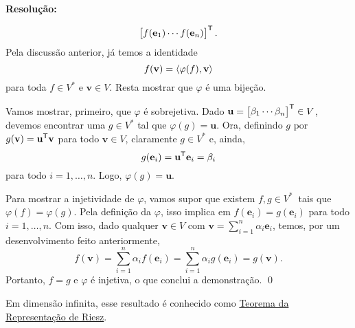 \documentclass[leqno]{article}
\numberwithin{equation}{section}
\newcommand{\bfv}{\mathbf{v}}
\newcommand{\bfu}{\mathbf{u}}
\newcommand{\bfe}{\mathbf{e}}
\newenvironment{sol}
{
    \vspace{4mm}
    \noindent\textbf{Resolução:}
    \strut\newline
    \smallskip
    \hspace{-3.5mm}
}
{}
\begin{document}
\begin{enumerate}
\begin{enumerate}
\begin{sol}
\begin{align*}
\begin{bmatrix}
                            f ( \bfe_{ 1 } ) \cdots f ( \bfe_{ n } )
                        \end{bmatrix}^{ \transpose }
                    .\end{align*}
                    Pela discussão anterior, já temos a identidade
                    \begin{equation*}
                        f ( \bfv ) = \dotprod{\varphi ( f ), \bfv}
                    \end{equation*}
                    para toda \( f \in V^{ * } \) e \( \bfv \in V \).
                    Resta mostrar que \( \varphi \) é uma bijeção.

                    Vamos mostrar, primeiro, que \( \varphi \) é sobrejetiva.
                    Dado \( \bfu =
                    \begin{bmatrix}
                        \beta_{ 1 } \cdots \beta_{ n }
                    \end{bmatrix}^{ \transpose } \in V\), devemos encontrar uma \( g \in V^{ * } \) tal que \( \varphi ( g ) = \bfu \).
                    Ora, definindo \( g \) por \( g ( \bfv ) = \bfu^{ \transpose } \bfv \) para todo \( \bfv \in V \), claramente \( g \in V^{ * } \) e, ainda,
                    \begin{equation*}
                        g ( \bfe_{ i } ) = \bfu^{ \transpose } \bfe_{ i } = \beta_{ i }
                    \end{equation*}
                    para todo \( i = 1, \dots, n \).
                    Logo, \( \varphi ( g ) = \bfu \).

                    Para mostrar a injetividade de \( \varphi \), vamos supor que existem \( f, g \in V^{ * } \ \) tais que \( \varphi ( f ) = \varphi ( g ) \).
                    Pela definição da \( \varphi \), isso implica em \( f ( \bfe_{ i } ) = g ( \bfe_{ i } ) \) para todo \( i = 1, \dots, n \).
                    Com isso, dado qualquer \( \bfv \in V \) com \( \bfv = \sum_{ i=1 }^{ n } \alpha_{ i } \bfe_{ i } \), temos, por um desenvolvimento feito anteriormente,
                    \begin{equation*}
                        f ( \bfv )
                        = \sum_{ i=1 }^{ n } \alpha_{ i } f ( \bfe_{ i } )
                        = \sum_{ i=1 }^{ n } \alpha_{ i } g ( \bfe_{ i } )
                        = g ( \bfv )
                    .\end{equation*}
                    Portanto, \( f = g \) e \( \varphi \) é injetiva, o que conclui a demonstração. \hfill \qed
                \end{sol} 
        \end{enumerate}
        Em dimensão infinita, esse resultado é conhecido como \href{https://en.wikipedia.org/wiki/Riesz_representation_theorem}{Teorema da Representação de Riesz}.
\end{enumerate}
\end{document}
